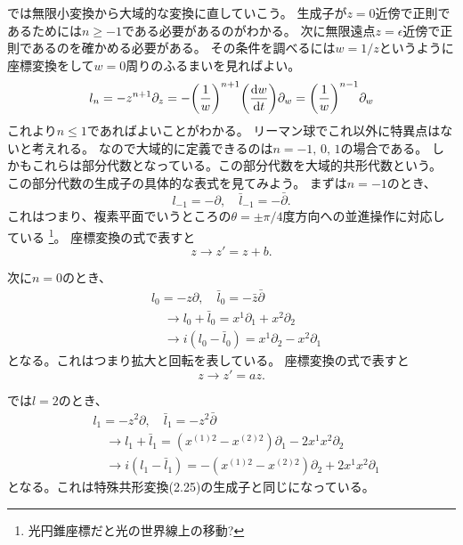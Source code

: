\documentclass[../../master.tex]{subfiles}
\begin{document}
では無限小変換から大域的な変換に直していこう。
生成子が\(z=0\)近傍で正則であるためには\(n\geq -1\)である必要があるのがわかる。
次に無限遠点\(z=\epsilon\)近傍で正則であるのを確かめる必要がある。
その条件を調べるには\(w=1/z\)というように座標変換をして\(w=0\)周りのふるまいを見ればよい。
\begin{equation}
    l_n = -z^{n+1}\partial_z = -\qty(\frac{1}{w})^{n+1}\qty(\dv{w}{t})\partial_w = \qty(\frac{1}{w})^{n-1}\partial_w
\end{equation}
これより\(n\leq 1\)であればよいことがわかる。
リーマン球でこれ以外に特異点はないと考えれる。
なので大域的に定義できるのは\(n=-1,\,0,\,1\)の場合である。
しかもこれらは部分代数となっている。この部分代数を大域的共形代数という。
この部分代数の生成子の具体的な表式を見てみよう。
まずは\(n=-1\)のとき、
\begin{equation*}
    l_{-1} = -\partial,\quad \bar{l}_{-1} = -\bar{\partial}.
\end{equation*}
これはつまり、複素平面でいうところの\(\theta=\pm \pi/4\)度方向への並進操作に対応している
\footnote{光円錐座標だと光の世界線上の移動?}。
座標変換の式で表すと
\begin{equation*}
    z\rightarrow z' = z + b.
\end{equation*}

次に\(n=0\)のとき、
\begin{align*}
    &l_0 = -z\partial,\quad \bar{l}_0 = -\bar{z}\bar{\partial}\\
    &\quad \rightarrow l_0 + \bar{l}_0 = x^1\partial_1 + x^2\partial_2\\
    &\quad \rightarrow i(l_0-\bar{l}_0) = x^1\partial_2 -x^2\partial_1
\end{align*}
となる。これはつまり拡大と回転を表している。
座標変換の式で表すと
\begin{equation*}
    z\rightarrow z'= az.
\end{equation*}

では\(l=2\)のとき、
\begin{align*}
    &l_{1} = -z^2\partial,\quad \bar{l}_{1} = -z^2\bar{\partial}\\
    &\quad \rightarrow l_1 + \bar{l}_1 = (x^{(1)2}-x^{(2)2})\partial_1 - 2x^1x^2\partial_2\\
    &\quad \rightarrow i(l_1-\bar{l}_1) = -(x^{(1)2}-x^{(2)2})\partial_2 + 2x^1x^2\partial_1
\end{align*}
となる。これは特殊共形変換(2.25)の生成子と同じになっている。%
\end{document}
